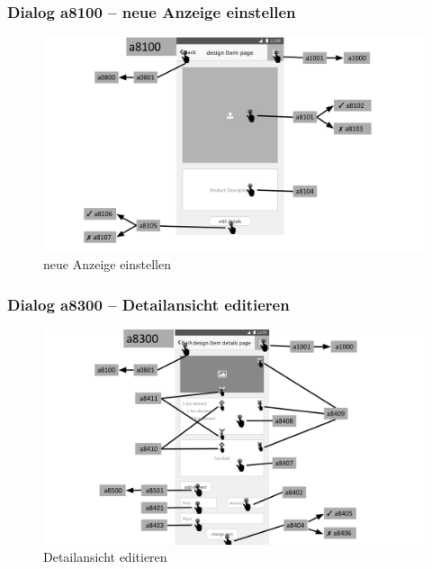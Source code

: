\documentclass[a4paper,12pt,oneside]{scrartcl}
\begin{document}
\subsubsection{Dialog a8100 – neue Anzeige einstellen }
\begin{figure}[!htbp]
\centering
\noindent\includegraphics[width=\linewidth,height=\textheight,keepaspectratio]{Dialoge/a8100}
\caption{neue Anzeige einstellen}
\end{figure}
\FloatBarrier

\subsubsection{Dialog a8300 – Detailansicht editieren}
\begin{figure}[!htbp]
\centering
\noindent\includegraphics[width=\linewidth,height=\textheight,keepaspectratio]{Dialoge/a8300}
\caption{Detailansicht editieren}
\end{figure}
\FloatBarrier
\end{document}
